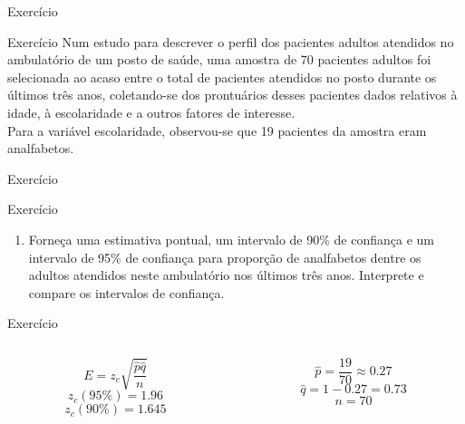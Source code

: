 \documentclass{beamer}
\begin{document}
\begin{frame}{Exercício}
  \begin{block}{Exercício}
    Num estudo para descrever o perfil dos pacientes adultos atendidos
    no ambulatório de um posto de saúde, uma amostra de 70 pacientes
    adultos foi selecionada ao acaso entre o total de pacientes
    atendidos no posto durante os últimos três anos, coletando-se dos
    prontuários desses pacientes dados relativos à idade, à
    escolaridade e a outros fatores de interesse.\\

    Para a variável escolaridade, observou-se que 19 pacientes da
    amostra eram analfabetos.
  \end{block}

\end{frame}

\begin{frame}{Exercício}
  \begin{block}{Exercício}
    \begin{enumerate}
    \item Forneça uma estimativa pontual, um intervalo de 90\% de
      confiança e um intervalo de 95\% de confiança para proporção de
      analfabetos dentre os adultos atendidos neste ambulatório nos
      últimos três anos. Interprete e compare os intervalos de
      confiança.
    \end{enumerate}
  \end{block}

  \begin{block}{Exercício}
    \begin{columns}
      \begin{column}{5cm}
        \begin{displaymath}
          E = z_c \sqrt{\frac{\hat{p}\hat{q} }{n}}
        \end{displaymath}
        \begin{displaymath}
          z_c (95\%) = 1.96
        \end{displaymath}
        \begin{displaymath}
          z_c (90\%) = 1.645
        \end{displaymath}
      \end{column}
      \begin{column}{5cm}
        \begin{displaymath}
          \hat{p} = \frac{19}{70} \approx 0.27
        \end{displaymath}
        \begin{displaymath}
          \hat{q} = 1-0.27 = 0.73
        \end{displaymath}
        \begin{displaymath}
          n = 70
        \end{displaymath}
      \end{column}
    \end{columns}
  \end{block}
\end{frame}
\end{document}
